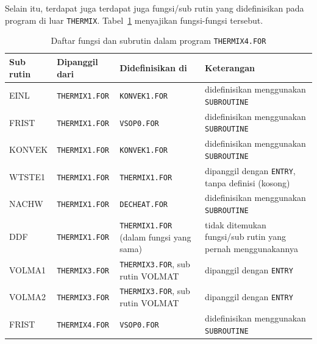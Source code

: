 \documentclass[a4paper,11pt]{report}
\renewcommand{\tablename}{Tabel}
\begin{document}
Selain itu, terdapat juga terdapat juga fungsi/sub rutin yang didefinisikan pada program di luar \texttt{THERMIX}. \tablename~\ref{tab:anomali} menyajikan fungsi-fungsi tersebut.

\begin{table}[h!]
  \caption{Daftar fungsi dan subrutin dalam program \texttt{THERMIX4.FOR}}
  \label{tab:anomali}
  \begin{center}
    \begin{tabular}{p{2cm}|p{2.75cm}|p{3cm}|p{4.5cm}} \toprule
    Sub rutin & Dipanggil dari & Didefinisikan di & Keterangan \\ \midrule
    EINL & \texttt{THERMIX1.FOR} & \texttt{KONVEK1.FOR} & didefinisikan menggunakan \texttt{SUBROUTINE} \\
    FRIST & \texttt{THERMIX1.FOR} & \texttt{VSOP0.FOR} & didefinisikan menggunakan \texttt{SUBROUTINE} \\
    KONVEK & \texttt{THERMIX1.FOR} & \texttt{KONVEK1.FOR} & didefinisikan menggunakan \texttt{SUBROUTINE} \\
    WTSTE1 & \texttt{THERMIX1.FOR} & \texttt{THERMIX1.FOR} & dipanggil dengan \texttt{ENTRY}, tanpa definisi (kosong)\\
    NACHW & \texttt{THERMIX1.FOR} & \texttt{DECHEAT.FOR} & didefinisikan menggunakan \texttt{SUBROUTINE} \\
    DDF & \texttt{THERMIX1.FOR} & \texttt{THERMIX1.FOR} (dalam fungsi yang sama) & tidak ditemukan fungsi/sub rutin yang pernah menggunakannya \\
    VOLMA1 & \texttt{THERMIX3.FOR} & \texttt{THERMIX3.FOR}, sub rutin VOLMAT & dipanggil dengan \texttt{ENTRY}\\
    VOLMA2 & \texttt{THERMIX3.FOR} & \texttt{THERMIX3.FOR}, sub rutin VOLMAT & dipanggil dengan \texttt{ENTRY}\\
    FRIST & \texttt{THERMIX4.FOR} & \texttt{VSOP0.FOR} & didefinisikan menggunakan \texttt{SUBROUTINE} \\
      \bottomrule
    \end{tabular}
  \end{center}
\end{table}
\end{document}
